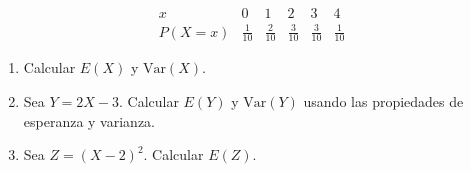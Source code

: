 \documentclass[12pt, a4paper]{article}
\newcounter{problema}
\newcounter{diaactual}
\newcommand{\dayheader}[2]{%
  \setcounter{diaactual}{#1}%
  \setcounter{problema}{0}%
  \section*{Clase #1 \normalfont\small— #2}%
  \addcontentsline{toc}{section}{Clase #1: #2}%
}
\begin{document}
\[
  \begin{array}{c|ccccc}
    x      & 0            & 1            & 2            & 3            & 4 \\
    \hline
    P(X=x) & \tfrac{1}{10} & \tfrac{2}{10} & \tfrac{3}{10} & \tfrac{3}{10} & \tfrac{1}{10}
  \end{array}
\]

\begin{enumerate}[label=\alph*)]
  \item Calcular $E(X)$ y $\mathrm{Var}(X)$.
  \item Sea $Y = 2X - 3$. Calcular $E(Y)$ y $\mathrm{Var}(Y)$
        usando las propiedades de esperanza y varianza.
  \item Sea $Z = (X-2)^2$. Calcular $E(Z)$.
\end{enumerate}

\end{document}
